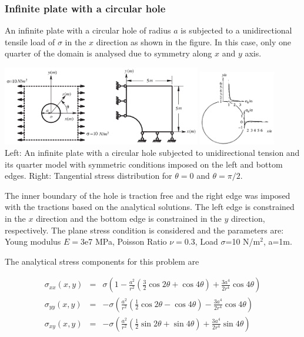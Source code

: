 \subsubsection{Infinite plate with a circular hole \cite{rama16}}
\mscthesis {}

An infinite plate with a circular hole of radius $a$ 
is subjected to a unidirectional tensile load of $\sigma$ in the $x$ direction as shown
in the figure. In this case, only one quarter of the domain is analysed due
to symmetry along $x$ and $y$ axis. 

\begin{center}
\includegraphics[width=0.65\textwidth]{images/benchmark_hole/yobu02}
\includegraphics[width=0.25\textwidth]{images/benchmark_hole/yobu02b}\\
{\scriptsize Left: An infinite plate with a circular hole subjected to unidirectional tension 
and its quarter model with symmetric conditions imposed on the left and bottom edges.
Right: Tangential stress distribution for $\theta=0$  and $\theta=\pi/2$. \cite{yobu02}}
\end{center}

The inner boundary of the hole is traction free and the right edge was
imposed with the tractions based on the analytical solutions.
The left edge is constrained in the $x$ direction and the bottom
edge is constrained in the $y$ direction, respectively. The plane stress
condition is considered and the parameters are: 
Young modulus $E=$3e7 MPa, Poisson Ratio $\nu=$0.3, Load $\sigma$=10 N/m$^2$, a=1m.

The analytical stress components for this
problem are 

\begin{eqnarray}
\sigma_{xx}(x,y) &=& \sigma \left(  1-\frac{a^2}{r^2}\left(\frac{3}{2}\cos 2\theta + \cos 4\theta \right) 
+ \frac{3a^4}{2r^4} \cos 4\theta \right) \\
\sigma_{yy}(x,y) &=& -\sigma \left( \frac{a^2}{r^2} \left(\frac{1}{2}\cos 2\theta - \cos 4\theta \right) 
- \frac{3a^4}{2r^4} \cos 4\theta \right) \\
\sigma_{xy}(x,y) &=& -\sigma \left( \frac{a^2}{r^2} \left(\frac{1}{2}\sin 2\theta + \sin 4\theta\right) 
+ \frac{3a^4}{2r^4} \sin 4\theta \right) 
\end{eqnarray}


